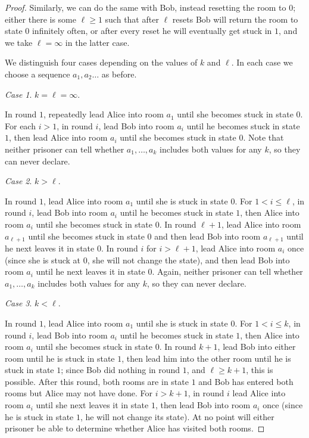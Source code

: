 \documentclass[a4paper,11pt]{extarticle}
\theoremstyle{definition}
\theoremstyle{remark}
\newtheorem{case}{Case}
\begin{document}
\begin{proof}
		Similarly, we can do the same with Bob, instead resetting the room to $0$; either there is some $\ell\geq 1$ such that after $\ell$ resets Bob will return the room to state $0$ infinitely often, or after every reset he will eventually get stuck in $1$, and we take $\ell=\infty$ in the latter case.
		
		We distinguish four cases depending on the values of $k$ and $\ell$. In each case we choose a sequence $a_1,a_2\ldots$ as before.
		
		\begin{case}$k=\ell=\infty$.\end{case}
		In round $1$, repeatedly lead Alice into room $a_1$ until she becomes stuck in state $0$. For each $i>1$, in round $i$, lead Bob into room $a_i$ until he becomes stuck in state $1$, then lead Alice into room $a_i$ until she becomes stuck in state $0$. Note that neither prisoner can tell whether $a_1,\ldots, a_k$ includes both values for any $k$, so they can never declare. 
		
		\begin{case}$k>\ell$.\end{case}
		In round $1$, lead Alice into room $a_1$ until she is stuck in state $0$. For $1<i\leq\ell$, in round $i$, lead Bob into room $a_i$ until he becomes stuck in state $1$, then Alice into room $a_i$ until she becomes stuck in state $0$. In round $\ell+1$, lead Alice into room $a_{\ell+1}$ until she becomes stuck in state $0$ and then lead Bob into room $a_{\ell+1}$ until he next leaves it in state $0$. In round $i$ for $i>\ell+1$, lead Alice into room $a_i$ once (since she is stuck at $0$, she will not change the state), and then lead Bob into room $a_i$ until he next leaves it in state $0$. Again, neither prisoner can tell whether $a_1,\ldots, a_k$ includes both values for any $k$, so they can never declare. 
		
		\begin{case}$k<\ell$.\end{case}
		In round $1$, lead Alice into room $a_1$ until she is stuck in state $0$. For $1<i\leq k$, in round $i$, lead Bob into room $a_i$ until he becomes stuck in state $1$, then Alice into room $a_i$ until she becomes stuck in state $0$. In round $k+1$, lead Bob into either room until he is stuck in state $1$, then lead him into the other room until he is stuck in state $1$; since Bob did nothing in round $1$, and $\ell\geq k+1$, this is possible. After this round, both rooms are in state $1$ and Bob has entered both rooms but Alice may not have done. For $i>k+1$, in round $i$ lead Alice into room $a_i$ until she next leaves it in state $1$, then lead Bob into room $a_i$ once (since he is stuck in state $1$, he will not change its state). At no point will either prisoner be able to determine whether Alice has visited both rooms.
		

\end{proof}
\end{document}
